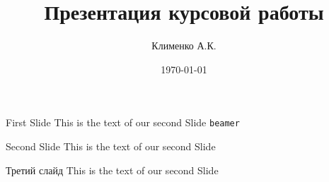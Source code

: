 \documentclass[aspectratio=169]{beamer} %
\begin{document}
\title{Презентация курсовой работы}
\author{Клименко А.К.}


\date{\today}
\subject{Компьютерная графика}
    
\begin{frame}{}
\titlepage
\end{frame}

\begin{frame}[c]{First Slide}
    This is the text of our second Slide \texttt{beamer}
\end{frame}

\begin{frame}{Second Slide}
    This is the text of our second Slide
\end{frame}


\begin{frame}{Третий слайд}
    This is the text of our second Slide
\end{frame}
\end{document}
